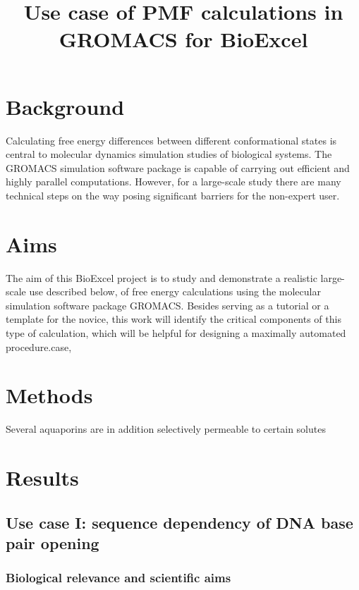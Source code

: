 \documentclass[11pt,a4paper]{article}
\title{Use case of PMF calculations in GROMACS for BioExcel}
\date{}
\begin{document}
\maketitle
\tableofcontents

\section{Background}
Calculating free energy differences between different conformational states is central to molecular dynamics simulation studies of biological systems. The GROMACS simulation software package is capable of carrying out efficient and highly parallel computations. However, for a large-scale study there are many technical steps on the way posing significant barriers for the non-expert user. 

\section{Aims}
 The aim of this BioExcel project is to study and demonstrate a realistic large-scale use described below, of free energy calculations using the molecular simulation software package GROMACS. Besides serving as a tutorial or a template for the novice, this work will identify the critical components of this type of calculation, which will be helpful for designing a maximally automated procedure.case, 
\section{Methods}
Several aquaporins are in addition selectively permeable to certain solutes 


\section{Results}
\subsection{Use case I: sequence dependency of DNA base pair opening}
\subsubsection{Biological relevance and scientific aims}
\end{document}
